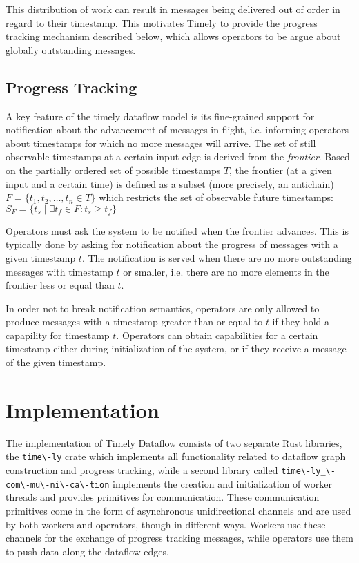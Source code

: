 This distribution of work can result in messages being delivered out of
order in regard to their timestamp. This motivates Timely to provide the
progress tracking mechanism described below, which allows operators to
be argue about globally outstanding messages.

\subsection{Progress Tracking}

A key feature of the timely dataflow model is its fine-grained support for notification
about the advancement of messages in flight, i.e. informing operators about
timestamps for which no more messages will arrive. The set of still observable
timestamps at a certain input edge is derived from the \emph{frontier}. Based on
the partially ordered set of possible timestamps $T$, the frontier (at a given
input and a certain time) is defined as a subset (more precisely, an antichain)
$F = \{t_1, t_2, \dots, t_n \in T \}$
which restricts the set of observable future timestamps:
$S_F = \{ t_s \mid \exists t_f \in F: t_s \geq t_f \}$

Operators must ask the system to be notified when the frontier advances. This
is typically done by asking for notification about the progress of messages with
a given timestamp $t$. The
notification is served when there are no more outstanding messages with
timestamp $t$ or smaller, i.e. there are no more elements in the frontier less
or equal than $t$.

In order not to break notification semantics, operators are only allowed to
produce messages with a timestamp greater than or equal to $t$ if they hold a
capapility for timestamp $t$. Operators can obtain capabilities for a certain
timestamp either during initialization of the system, or if they receive a
message of the given timestamp.

\section{Implementation}

The implementation of Timely Dataflow consists of two separate Rust libraries,
the \lstinline{time\-ly} crate which implements all functionality related to
dataflow graph construction and progress tracking, while a second library
called \lstinline{time\-ly_\-com\-mu\-ni\-ca\-tion} implements the creation and
initialization of worker threads and provides primitives for communication.
These communication primitives come in the form of asynchronous unidirectional
channels and are used by both workers and operators, though in different ways.
Workers use these channels for the exchange of progress tracking messages, while
operators use them to push data along the dataflow edges.

